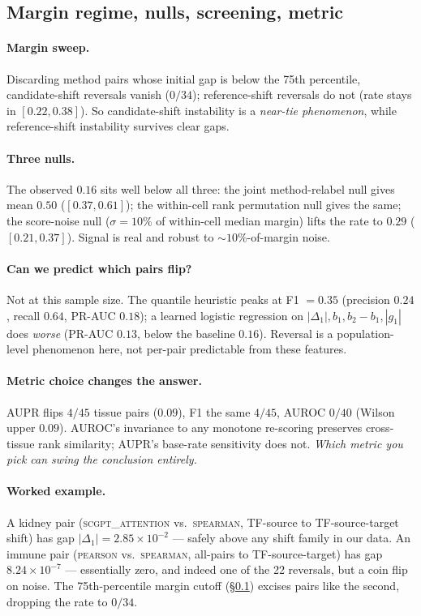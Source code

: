 \documentclass[sigconf,anonymous]{acmart}
\begin{document}
\subsection{Margin regime, nulls, screening, metric}
\label{sec:margin}

\paragraph{Margin sweep.} Discarding method pairs whose initial gap is
below the 75th percentile, candidate-shift reversals vanish ($0/34$);
reference-shift reversals do not (rate stays in $[0.22, 0.38]$). So
candidate-shift instability is a \emph{near-tie phenomenon}, while
reference-shift instability survives clear gaps.

\paragraph{Three nulls.} The observed $0.16$ sits well below all three:
the joint method-relabel null gives mean $0.50$ ($[0.37, 0.61]$); the
within-cell rank permutation null gives the same; the score-noise null
($\sigma = 10\%$ of within-cell median margin) lifts the rate to $0.29$
($[0.21, 0.37]$). Signal is real and robust to $\sim10\%$-of-margin noise.

\paragraph{Can we predict which pairs flip?} Not at this sample size. The
quantile heuristic peaks at F1 $= 0.35$ (precision $0.24$, recall $0.64$,
PR-AUC $0.18$); a learned logistic regression on
$|\Delta_1|, b_1, b_2{-}b_1, |g_1|$ does \emph{worse} (PR-AUC $0.13$,
below the baseline $0.16$). Reversal is a population-level phenomenon
here, not per-pair predictable from these features.

\paragraph{Metric choice changes the answer.} AUPR flips $4/45$ tissue
pairs ($0.09$), F1 the same $4/45$, AUROC $0/40$ (Wilson upper $0.09$).
AUROC's invariance to any monotone re-scoring preserves cross-tissue
rank similarity; AUPR's base-rate sensitivity does not. \emph{Which
metric you pick can swing the conclusion entirely.}

{\sloppy
\paragraph{Worked example.} A kidney pair (\textsc{scgpt\_attention} vs.\
\textsc{spearman}, TF-source to TF-source-target shift) has gap
$|\Delta_1| = 2.85\times 10^{-2}$ --- safely above any shift family in our
data. An immune pair (\textsc{pearson} vs.\ \textsc{spearman}, all-pairs
to TF-source-target) has gap $8.24\times 10^{-7}$ --- essentially zero,
and indeed one of the 22 reversals, but a coin flip on noise. The
75th-percentile margin cutoff (\S\ref{sec:margin}) excises pairs like the
second, dropping the rate to $0/34$.
\par}
\end{document}
